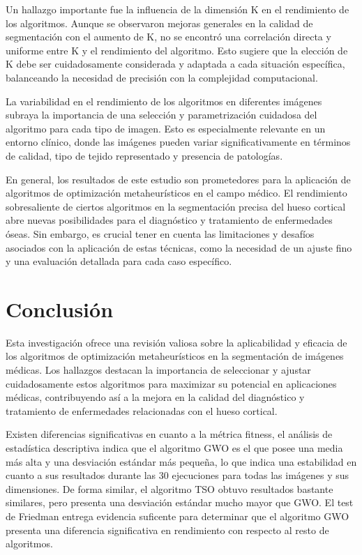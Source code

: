 \documentclass[conference]{IEEEtran}
\begin{document}
\noindent Un hallazgo importante fue la influencia de la dimensión K en el rendimiento de los algoritmos. Aunque se observaron mejoras generales en la calidad de segmentación con el aumento de K, no se encontró una correlación directa y uniforme entre K y el rendimiento del algoritmo. Esto sugiere que la elección de K debe ser cuidadosamente considerada y adaptada a cada situación específica, balanceando la necesidad de precisión con la complejidad computacional.

\noindent La variabilidad en el rendimiento de los algoritmos en diferentes imágenes subraya la importancia de una selección y parametrización cuidadosa del algoritmo para cada tipo de imagen. Esto es especialmente relevante en un entorno clínico, donde las imágenes pueden variar significativamente en términos de calidad, tipo de tejido representado y presencia de patologías.

\noindent En general, los resultados de este estudio son prometedores para la aplicación de algoritmos de optimización metaheurísticos en el campo médico. El rendimiento sobresaliente de ciertos algoritmos en la segmentación precisa del hueso cortical abre nuevas posibilidades para el diagnóstico y tratamiento de enfermedades óseas. Sin embargo, es crucial tener en cuenta las limitaciones y desafíos asociados con la aplicación de estas técnicas, como la necesidad de un ajuste fino y una evaluación detallada para cada caso específico.





\section{Conclusión} \label{sec:co}

\noindent Esta investigación ofrece una revisión valiosa sobre la aplicabilidad y eficacia de los algoritmos de optimización metaheurísticos en la segmentación de imágenes médicas. Los hallazgos destacan la importancia de seleccionar y ajustar cuidadosamente estos algoritmos para maximizar su potencial en aplicaciones médicas, contribuyendo así a la mejora en la calidad del diagnóstico y tratamiento de enfermedades relacionadas con el hueso cortical.

\noindent Existen diferencias significativas en cuanto a la métrica fitness, el análisis de estadística descriptiva indica que el algoritmo GWO es el que posee una media más alta y una desviación estándar más pequeña, lo que indica una estabilidad en cuanto a sus resultados durante las 30 ejecuciones para todas las imágenes y sus dimensiones. De forma similar, el algoritmo TSO obtuvo resultados bastante similares, pero presenta una desviación estándar mucho mayor que GWO. El test de Friedman entrega evidencia suficente para determinar que el algoritmo GWO presenta una diferencia significativa en rendimiento con respecto al resto de algoritmos.
\end{document}
